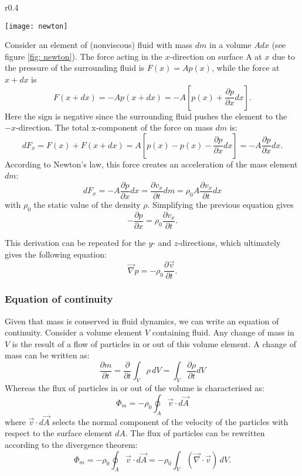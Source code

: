 \begin{wrapfigure}{r}{0.4\textwidth}
	\vspace{-10pt}
  \begin{center}
    \texttt{[image: newton]}
  \end{center}
  \caption{}\label{fig: newton}
  \vspace{-20pt}
\end{wrapfigure}

Consider an element of (nonviscous) fluid with mass $dm$ in a volume $A dx$ (see figure \ref{fig: newton}). The force acting in the $x$-direction on surface A at $x$ due to the pressure of the surrounding fluid  is $F(x) = A p(x) $, while the force at $x +dx$ is 
\[
F(x+dx) = - A p(x+dx) = -A [p(x) + \frac{\partial p}{\partial x} dx].
\]
Here the sign is negative since the surrounding fluid pushes the element to the $-x$-direction.
The total x-component of the force on mass $dm$ is:
\[
dF_x = F(x) + F(x+dx) = A [p(x) - p(x) - \frac{\partial p}{\partial x} dx] = - A \frac{\partial p}{\partial x} dx.
\]  
According to Newton's law, this force creates an acceleration of the mass element $dm$:
\[
dF_x = - A \frac{\partial p}{\partial x} dx = \frac{\partial v_x}{\partial t} dm = \rho_0 A \frac{\partial v_x}{\partial t} dx
\]
with $\rho_0$ the static value of the density $\rho$. Simplifying the previous equation gives
\[
- \frac{\partial p}{\partial x} = \rho_0 \frac{\partial v_x}{\partial t}.
\]

This derivation can be repeated for the $y$- and $z$-directions, which ultimately gives the following equation:
\begin{equation}
\vec{\nabla} p = - \rho_0 \frac{\partial \vec{v}}{\partial t}.
\label{newt}
\end{equation}


\subsubsection*{Equation of continuity}
\vspace{-15pt}
Given that mass is conserved in fluid dynamics, we can write an equation of continuity. Consider a volume element $V$ containing fluid. Any change of mass in $V$ is the result of a flow of particles in or out of this volume element. A change of mass can be written as:
\[
\frac{\partial m}{\partial t} = \frac{\partial }{\partial t} \int_{V} \rho \,dV =\int_{V} \frac{\partial \rho}{\partial t} dV
\]
Whereas the flux of particles in or out of the volume is characterised as:
\[
\Phi_m = - \rho_0 \oint_A \vec{v} \cdot d\vec{A}
\]
where $\vec{v} \cdot d\vec{A}$ selects the normal component of the velocity of the particles with respect to the surface element $dA$.
The flux of particles can be rewritten according to the divergence theorem:
\[
\Phi_m = - \rho_0 \oint_A \vec{v} \cdot d\vec{A} =- \rho_0 \int_{V} (\vec{\nabla} \cdot \vec{v}) \, dV.
\]


